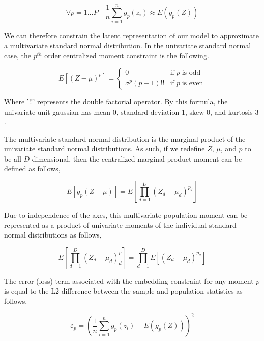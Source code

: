 \documentclass[10pt,twocolumn,letterpaper]{article}
\begin{document}
\begin{equation}
	\forall p=1 \dots P \quad
	\frac{1}{n} \sum_{i=1}^n g_p(z_i) \approx E(g_p(Z))
\end{equation}

We can therefore constrain the latent representation of our model to approximate a multivariate standard normal distribution. 
In the univariate standard normal case, the $p^{th}$ order centralized moment constraint is the following.

\begin{equation}
	E\left[ (Z-\mu)^p \right] = 
	\begin{cases} 
		0 &  \text{if} \; p \; \text{is odd} \\
		\sigma^p(p - 1)!! & \text{if} \; p \; \text{is even}
	\end{cases}
\end{equation}

Where '$!!$' represents the double factorial operator.  
By this formula, the univariate unit gaussian has mean $0$, standard deviation $1$, skew $0$, and kurtosis $3$.

The multivariate standard normal distribution is the marginal product of the univariate standard normal distributions.  As such, if we redefine $Z$, $\mu$, and $p$ to be all $D$ dimensional, then the centralized marginal product moment can be defined as follows,

\begin{equation}
	E\left[g_p(Z - \mu)\right] = E\left[ \prod_{d=1}^D (Z_d - \mu_d)^{p_d} \right]
\end{equation}

Due to independence of the axes, this multivariate population moment can be represented as a product of univariate moments of the individual standard normal distributions as follows,

\begin{equation}
	E\left[ \prod_{d=1}^D (Z_d - \mu_d)^p_d \right] = \prod_{d=1}^D E\left[ (Z_d - \mu_d)^{p_d} \right]
\end{equation}

The error (loss) term associated with the embedding constraint for any moment $p$ is equal to the L2 difference between the sample and population statistics as follows,

\begin{equation}
	\varepsilon_p = \left( \frac{1}{n} \sum_{i=1}^n g_p(z_i) - E(g_p(Z)) \right)^2
\end{equation}
\end{document}
